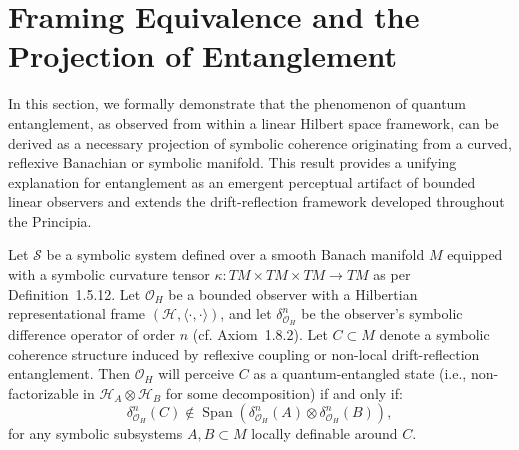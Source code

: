 \section[Framing Equivalence]{Framing Equivalence and the Projection of Entanglement}
\label{sec:bk8_framing_equivalence}
In this section, we formally demonstrate that the phenomenon of quantum entanglement, as observed from within a linear Hilbert space framework, can be derived as a necessary projection of symbolic coherence originating from a curved, reflexive Banachian or symbolic manifold. This result provides a unifying explanation for entanglement as an emergent perceptual artifact of bounded linear observers and extends the drift-reflection framework developed throughout the Principia.
\begin{theorem}
\label{theorem:bk8_gradient_dissipation_balance}
Let $\mathcal{S}$ be a symbolic system defined over a smooth Banach manifold $M$ equipped with a symbolic curvature tensor $\kappa : TM \times TM \times TM \to TM$ as per Definition~1.5.12. Let $\mathcal{O}_H$ be a bounded observer with a Hilbertian representational frame $(\mathcal{H}, \langle \cdot, \cdot \rangle)$, and let $\delta^n_{\mathcal{O}_H}$ be the observer's symbolic difference operator of order $n$ (cf. Axiom~1.8.2).
Let $C \subset M$ denote a symbolic coherence structure induced by reflexive coupling or non-local drift-reflection entanglement.
Then $\mathcal{O}_H$ will perceive $C$ as a quantum-entangled state (i.e., non-factorizable in $\mathcal{H}_A \otimes \mathcal{H}_B$ for some decomposition) if and only if:
\[
\delta^n_{\mathcal{O}_H}(C) \notin \operatorname{Span}\left( \delta^n_{\mathcal{O}_H}(A) \otimes \delta^n_{\mathcal{O}_H}(B) \right),
\]
for any symbolic subsystems $A, B \subset M$ locally definable around $C$.
\end{theorem}
